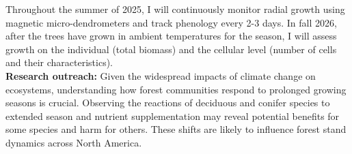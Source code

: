 \documentclass{article}
\begin{document}
Throughout the summer of 2025, I will continuously monitor radial growth using magnetic micro-dendrometers and track phenology every 2-3 days. In fall 2026, after the trees have grown in ambient temperatures for the season, I will assess growth on the individual (total biomass) and the cellular level (number of cells and their characteristics). \\
\textbf{Research outreach:} Given the widespread impacts of climate change on ecosystems, understanding how forest communities respond to prolonged growing seasons is crucial. Observing the reactions of deciduous and conifer species to extended season and nutrient supplementation may reveal potential benefits for some species and harm for others. These shifts are likely to influence forest stand dynamics across North America.


\end{document}
